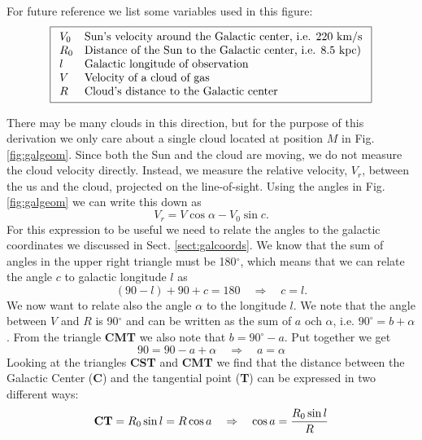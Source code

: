 For future reference we list some variables used in this figure:
\begin{displaymath}
	\boxed{
\begin{array}{ll}
	V_0 	&\hbox{Sun's velocity around the Galactic center, i.e. 220 km/s}					\\
    R_0	&\hbox{Distance of the Sun to the Galactic center, i.e. 8.5 kpc}) 					\\
l	&\hbox{Galactic longitude of observation}				\\
V	&\hbox{Velocity of a cloud of gas}			\\
R	&\hbox{Cloud's distance to the Galactic center}		\\
\end{array}
}
\end{displaymath}

There may be many clouds in this direction, but for the purpose of this
derivation we only care about a single cloud located at position $M$ in Fig.
\ref{fig:galgeom}. Since both the Sun and the cloud are moving, we do not measure
the cloud velocity directly. Instead, we measure the relative velocity, $V_r$,
between the us and the cloud, projected on the line-of-sight.  Using the angles
in Fig. \ref{fig:galgeom} we can write this down as 
\begin{equation}
V_r = V \cos\alpha - V_0 \sin c .
\label{eqn:vrel1}
\end{equation}
For this expression to be useful we need to relate the angles to the galactic
coordinates we discussed in Sect. \ref{sect:galcoords}.  We know that
the sum of angles in the upper right triangle must be 180$^\circ$, which means that 
we can relate the angle $c$ to galactic longitude $l$ as
\begin{equation}
(90-l)+90+c=180 \quad \Rightarrow \quad c=l.
\label{eqn:c}
\end{equation}
We now want to relate also the angle $\alpha$ to the longitude $l$. 
We note that the angle between $V$ and $R$ is 90$^\circ$ and can be written
as the sum of $a$ och $\alpha$, i.e. $90^\circ = b + \alpha$. 
From the triangle {\bf CMT} we also note that $b = 90^\circ - a$.
Put together we get  
\begin{equation}
    90 = 90-a+\alpha \quad \Rightarrow \quad a = \alpha
\label{eqn:a}
\end{equation}
Looking at the triangles {\bf CST} and {\bf CMT} we find that the distance
between the Galactic Center ({\bf C}) and the tangential point ({\bf T}) can be
expressed in two different ways: 
\begin{equation}
	{\rm\bf CT} = R_0\sin l = R \cos a \quad \Rightarrow \quad \cos a = \frac{R_0\sin l}{R}
\label{eqn:cosalpha}
\end{equation}
